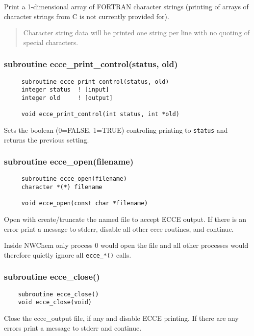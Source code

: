 Print a 1-dimensional array of FORTRAN character strings (printing of
arrays of character strings from C is not currently provided for).

\begin{quotation}

      Character string data will be printed one string per line
      with no quoting of special characters.

\end{quotation}


\subsubsection{subroutine ecce\_print\_control(status, old)}

\begin{verbatim}
     subroutine ecce_print_control(status, old)
     integer status  ! [input]
     integer old     ! [output]

     void ecce_print_control(int status, int *old)
\end{verbatim}

Sets the boolean (0=FALSE, 1=TRUE) controling printing to \verb=status= and
returns the previous setting.

\subsubsection{  subroutine ecce\_open(filename)}

\begin{verbatim}
     subroutine ecce_open(filename)
     character *(*) filename

     void ecce_open(const char *filename)
\end{verbatim}
    Open with create/truncate the named file to accept ECCE output.
    If there is an error print a message to stderr, disable all
    other ecce routines, and continue. 

    Inside NWChem only process $0$ would open the file and all other
    processes would therefore quietly ignore all \verb+ecce_*()+ calls.

\subsubsection{subroutine ecce\_close()}

\begin{verbatim}
    subroutine ecce_close()
    void ecce_close(void)
\end{verbatim}
Close the ecce\_output file, if any and disable ECCE printing.  If
there are any errors print a message to stderr and continue.

